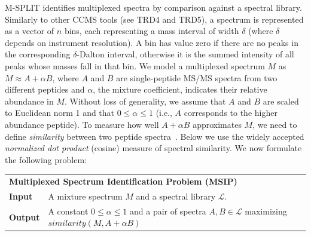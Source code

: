 \documentclass[arial,11pt]{article}
\newcommand{\speclib}{\ensuremath{\mathcal{L}}}
\begin{document}
M-SPLIT identifies multiplexed spectra by comparison against a spectral library.
Similarly to other CCMS tools (see TRD4 and TRD5), a  spectrum is represented as a vector of $n$ bins, each representing a mass interval of width $\delta$ (where $\delta$ depends on instrument resolution).  A bin has value zero if there are no peaks in the corresponding $\delta$-Dalton interval, otherwise it is the summed intensity of all peaks whose masses fall in that bin.  We model a multiplexed spectrum $M$ as $M \approx  A+\alpha B$, where $A$ and $B$ are single-peptide MS/MS spectra from two different peptides and $\alpha$, the mixture coefficient, indicates their relative abundance in $M$. Without loss of generality, we assume that $A$ and $B$ are scaled to Euclidean norm 1 and that $0\leq\alpha\leq 1$ (i.e., $A$ corresponds to the higher abundance peptide).  To measure how well $A+\alpha B$ approximates $M$, we need to  define {\em similarity} between two peptide spectra~\cite{atwater1985,craig06,lam2007}. Below we  use the widely accepted {\em normalized dot product} (cosine) measure of spectral similarity.
We now formulate the following  problem:\\

\begin{tabular}{ll}
\multicolumn{2}{l}{\textbf{Multiplexed Spectrum Identification Problem (MSIP)}}\\
\textbf{Input}  & A mixture spectrum $M$ and a spectral library \speclib.\\
\textbf{Output} & A constant $0\leq\alpha\leq 1$ and a pair of spectra ${A,B}\in\speclib$ maximizing $similarity(M,A+\alpha B)$\\
\end{tabular}\ \\


\end{document}
